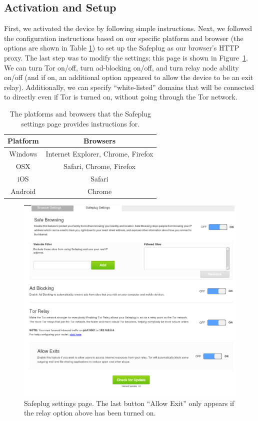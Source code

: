 \documentclass[letterpaper,twocolumn,10pt]{article}
\begin{document}
\subsection{Activation and Setup}

First, we activated the device by following simple instructions.  Next, we followed the configuration instructions based on our specific platform and browser (the options are shown in Table \ref{table_example}) to set up the Safeplug as our browser's HTTP proxy.  The last step was to modify the settings; this page is shown in Figure~\ref{fig:settings}.  We can turn Tor on/off, turn ad-blocking on/off, and turn relay node ability on/off (and if on, an additional option appeared to allow the device to be an exit relay).  Additionally, we can specify ``white-listed'' domains that will be connected to directly even if Tor is turned on, without going through the Tor network.

\begin{table}[!t]
\renewcommand{\arraystretch}{1.3}
\caption{The platforms and browsers that the Safeplug settings page provides instructions for.}
\label{table_example}
\centering
\small
	\begin{tabular}{|c|c|}
	\hline
		Platform & Browsers \\ \hline
		Windows	& Internet Explorer, Chrome, Firefox \\ \hline
		OSX & Safari, Chrome, Firefox \\ \hline
		iOS	& Safari \\ \hline
		Android	& Chrome \\ \hline
	\end{tabular}
\end{table}



\begin{figure}
  \centering
  \includegraphics[width=.5\textwidth]{settings_with_exit}
  \caption{Safeplug settings page.  The last button ``Allow Exit'' only appears if the relay option above has been turned on.}
  \label{fig:settings}
\end{figure}
\end{document}
